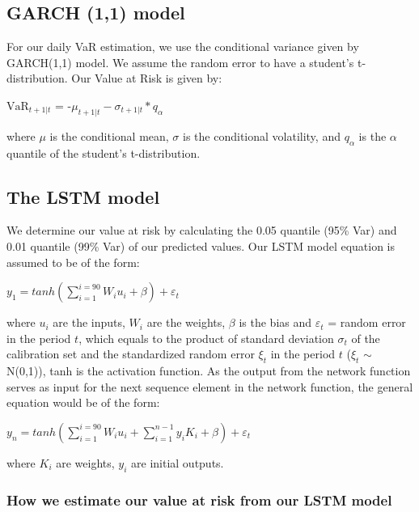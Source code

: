 \documentclass[a4paper,11pt,oneside]{book}
\begin{document}
\subsection{GARCH (1,1) model}

For our daily VaR estimation, we use the conditional variance given by GARCH(1,1) model. We assume the random error to have a student’s t-distribution. Our Value at Risk is given by:
\begin{center}
$\text{VaR}_{t+1|t}$ = -$\mu_{t+1|t} - \sigma_{t+1|t} * q_{\alpha}$
\end{center}
where $\mu$ is the conditional mean, $\sigma$ is the conditional volatility, and $q_{\alpha}$ is the $\alpha$ quantile of the student's t-distribution.

\subsection{The LSTM model}
We determine our value at risk by calculating the 0.05 quantile (95\% Var) and 0.01 quantile (99\% Var) of our predicted values. Our LSTM model equation is assumed to be of the form:
\begin{center}
	$y_1= tanh(\sum_{i=1}^{i=90}W_{i}u_{i}+\beta)+\varepsilon_t$
\end{center} 

where $u_{i}$ are the inputs, $W_i$ are the weights, $\beta$ is the bias and $\varepsilon_t$ = random error in the period $t$, which equals to the
product of standard deviation $\sigma_t$ of the calibration set and  the
standardized random error $\xi_t$ in the period $t$ ($\xi_t$ $\sim$ N(0,1)), tanh is the activation function. As the output from the network function serves as input for the next sequence element in the network function, the general equation would be of the form:

\begin{center}
	$y_n= tanh(\sum_{i=1}^{i=90}W_{i}u_{i}+\sum_{i=1}^{n-1}y_{i}K_{i}+\beta)+\varepsilon_t$
\end{center} 
where $K_i$ are weights, $y_i$ are initial outputs.\newline

\subsubsection{How we estimate our value at risk from our LSTM model}
\end{document}
